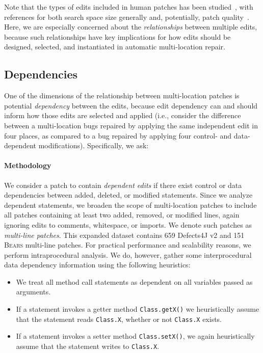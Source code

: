 \documentclass[10pt, conference]{IEEEtran}
\newcommand\bears{\textsc{Bears}\xspace}
\begin{document}
Note that the types of edits included in human patches has been
studied~\cite{examples}, with references for both search space size generally
and, potentially, patch quality~\cite{moreexamples}.  Here, we are especially
concerned about the 
\emph{relationships} between multiple edits, because such relationships have
key implications for how edits should be designed, selected, and instantiated 
in automatic multi-location repair. 

\subsection{Dependencies}

One of the dimensions of the relationship between multi-location patches is potential
\emph{dependency} between the edits, because edit dependency can and should
inform how those edits are selected and applied (i.e., consider the difference
between a multi-location
bugs repaired by applying the same independent edit in four places, as
compared to a bug repaired by applying  four control- and data-dependent
modifications).  Specifically, we ask:


\paragraph{Methodology}
We consider a patch to contain \emph{dependent edits} if there exist 
control or data dependencies between added, deleted, or modified statements.
Since we analyze dependent statements, we broaden the scope of multi-location patches to 
include all patches containing at least two added, removed, or modified lines, 
again ignoring edits to comments, whitespace, or imports.
We denote such patches as \emph{multi-line patches}.
This expanded dataset contains 659 Defects4J v2 and 151 \bears 
multi-line patches.
For practical performance and scalability reasons, 
we perform intraprocedural analysis. 
We do, however, gather some interprocedural data dependency information 
using the following heuristics:
\begin{itemize}
	\item We treat all method call statements as dependent on all variables
          passed as arguments. 
	\item If a statement invokes a getter method \texttt{Class.getX()} 
          we heuristically assume that the statement reads \texttt{Class.X},
          whether or not \texttt{Class.X} exists.
	\item If a statement invokes a setter method \texttt{Class.setX()}, 
	we again heuristically assume that the statement writes to \texttt{Class.X}. 
\end{itemize}
\end{document}

